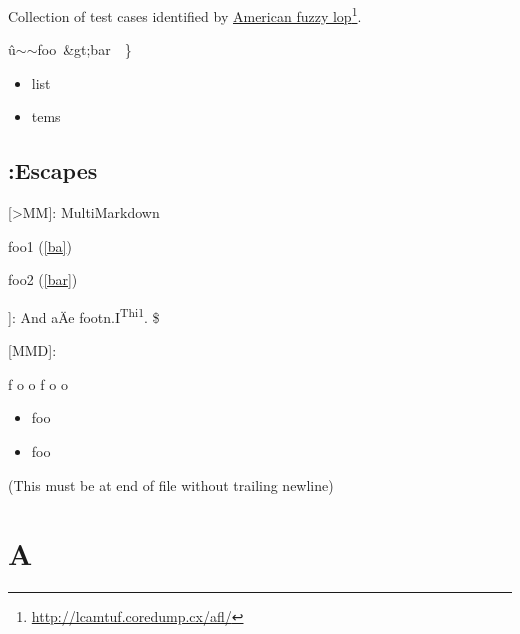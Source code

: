 
\def\mytitle{Fuzz Testing}



Collection of test cases identified by \href{http://lcamtuf.coredump.cx/afl/}{American fuzzy lop}\footnote{\href{http://lcamtuf.coredump.cx/afl/}{http:\slash{}\slash{}lcamtuf.coredump.cx\slash{}afl\slash{}}}.

û\ensuremath{\sim}\ensuremath{\sim}foo~&gt;bar~~\}

\begin{itemize}
\item list

\item tems

\end{itemize}

\chapter{:Escapes}
\label{escaped}

[>MM]: MultiMarkdown

foo1 (\autoref{ba})

foo2 (\autoref{bar})

]: And aÄe footn.I\textsuperscript{Thi1}. \$

{[MMD]}:

f \gls{o o} f \gls{o o}

\begin{itemize}
\item foo

\item foo

\end{itemize}

(This must be at end of file without trailing newline)

\part{A}
\label{a}



